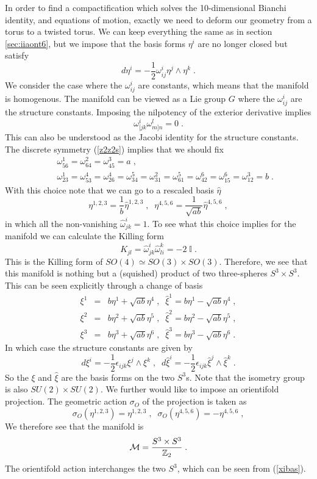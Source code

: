 \documentclass[11pt,a4paper]{article}
\numberwithin{equation}{section}
\numberwithin{table}{section}\setlength{\multlinegap}{25pt}
\newcommand{\bea}{\begin{eqnarray}}  \newcommand{\eea}{\end{eqnarray}}
\newcommand{\nn}{\nonumber}
\newcommand{\be}{\begin{equation}}
\newcommand{\ee}{\end{equation}}
\newcommand{\half}{\frac{1}{2}}
\begin{document}
In order to find a compactification which solves the 10-dimensional Bianchi identity, and equations of motion, exactly we need to deform our geometry from a torus to a twisted torus. We can keep everything the same as in section \ref{sec:iiaont6}, but we impose that the basis forms $\eta^i$ are no longer closed but satisfy
\be
d \eta^i = - \half \omega^i_{ij} \eta^j \wedge \eta^k \;.
\ee
We consider the case where the $\omega^i_{ij}$ are constants, which means that the manifold is homogenous. The manifold can be viewed as a Lie group $G$ where the $\omega^i_{ij}$ are the structure constants. Imposing the nilpotency of the exterior derivative implies
\be
\omega^i_{[jk}\omega^l_{m]n} = 0 \;.
\ee
This can also be understood as the Jacobi identity for the structure constants. The discrete symmetry (\ref{z2z2s}) implies that we should fix 
\bea
& &\omega^1_{56}=\omega^2_{64}=\omega^3_{45}=a \;, \nn \\
& &\omega^1_{23}=\omega^4_{53}=\omega^4_{26}=\omega^5_{34}=\omega^2_{31}=\omega^5_{61}=\omega^6_{42}=\omega^6_{15}=\omega^3_{12}=b \;.
\eea
With this choice note that we can go to a rescaled basis $\hat{\eta}$
\be
\eta^{1,2,3} = \frac{1}{b} \hat{\eta}^{1,2,3} \;,\;\; \eta^{4,5,6} = \frac{1}{\sqrt{ab}} \hat{\eta}^{4,5,6} \;,
\ee
in which all the non-vanishing $\hat{\omega}^{i}_{jk}=1$. To see what this choice implies for the manifold we can calculate the Killing form
\be
K_{jl} = \hat{\omega}^{i}_{jk}\hat{\omega}^{k}_{li} = -2\; \mathbb{I} \;.
\ee
This is the Killing form of $SO(4) \simeq SO(3) \times SO(3)$. Therefore, we see that this manifold is nothing but a (squished) product of two three-spheres $S^3 \times S^3$. This can be seen explicitly through a change of basis 
\bea
\xi^1 &=& b \eta^1 + \sqrt{ab}\eta^4 \;, \;\; \hat{\xi}^1 = b \eta^1 - \sqrt{ab}\eta^4 \nn \;, \\
\xi^2 &=& b \eta^2 + \sqrt{ab}\eta^5 \;, \;\; \hat{\xi}^2 = b \eta^2 - \sqrt{ab}\eta^5 \nn \;, \\
\xi^3 &=& b \eta^3 + \sqrt{ab}\eta^6 \;, \;\; \hat{\xi}^3 = b \eta^3 - \sqrt{ab}\eta^6 \;. 
\label{xibas}
\eea
In which case the structure constants are given by
\be
d \xi^i = - \half \epsilon_{ijk} \xi^j \wedge \xi^k \;,\;\; d \hat{\xi}^i = - \half \epsilon_{ijk} \hat{\xi}^j \wedge \hat{\xi}^k \;.
\ee
So the $\xi$ and $\hat{\xi}$ are the basis forms on the two $S^3$s. Note that the isometry group is also $SU(2) \times SU(2)$.
We further would like to impose an orientifold projection. The geometric action $\sigma_O$ of the projection is taken as
\be
\sigma_O\left(\eta^{1,2,3} \right) = \eta^{1,2,3} \;, \;\;\sigma_O\left(\eta^{4,5,6} \right) = -\eta^{4,5,6} \;,
\ee
We therefore see that the manifold is 
\be
{\cal M} = \frac{S^3 \times S^3}{\mathbb{Z}_2} \;.
\ee
The orientifold action interchanges the two $S^3$, which can be seen from (\ref{xibas}).
\end{document}
